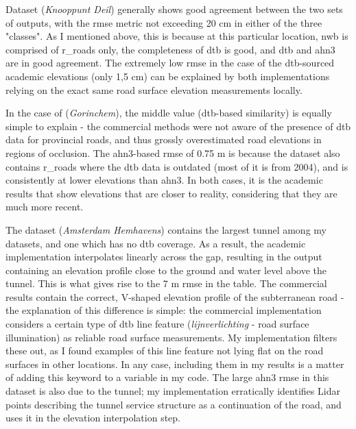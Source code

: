 Dataset  (\textit{Knooppunt Deil}) generally shows good agreement between the two sets of outputs, with the \ac{rmse} metric not exceeding 20 cm in either of the three "classes". As I mentioned above, this is because at this particular location, \ac{nwb} is comprised of \ac{r_roads} only, the completeness of \ac{dtb} is good, and \ac{dtb} and \ac{ahn3} are in good agreement. The extremely low \ac{rmse} in the case of the \ac{dtb}-sourced academic elevations (only 1,5 cm) can be explained by both implementations relying on the exact same road surface elevation measurements locally.

In the case of  (\textit{Gorinchem}), the middle value (\ac{dtb}-based similarity) is equally simple to explain - the commercial methods were not aware of the presence of \ac{dtb} data for provincial roads, and thus grossly overestimated road elevations in regions of occlusion. The \ac{ahn3}-based \ac{rmse} of 0.75 m is because the dataset also contains \ac{r_roads} where the \ac{dtb} data is outdated (most of it is from 2004), and is consistently at lower elevations than \ac{ahn3}. In both cases, it is the academic results that show elevations that are closer to reality, considering that they are much more recent.

The dataset  (\textit{Amsterdam Hemhavens}) contains the largest tunnel among my datasets, and one which has no \ac{dtb} coverage. As a result, the academic implementation interpolates linearly across the gap, resulting in the output containing an elevation profile close to the ground and water level above the tunnel. This is what gives rise to the 7 m \ac{rmse} in the table. The commercial results contain the correct, V-shaped elevation profile of the subterranean road - the explanation of this difference is simple: the commercial implementation considers a certain type of \ac{dtb} line feature (\textit{lijnverlichting} - road surface illumination) as reliable road surface measurements. My implementation filters these out, as I found examples of this line feature not lying flat on the road surfaces in other locations. In any case, including them in my results is a matter of adding this keyword to a variable in my code. The large \ac{ahn3} \ac{rmse} in this dataset is also due to the tunnel; my implementation erratically identifies Lidar points describing the tunnel service structure as a continuation of the road, and uses it in the elevation interpolation step.

